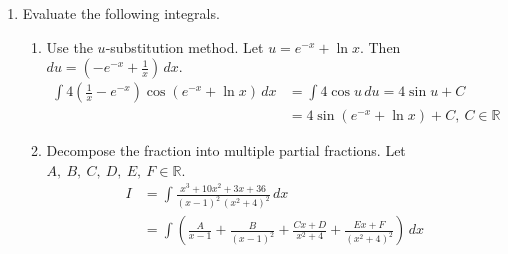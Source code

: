 \documentclass[a4paper, 12pt]{article}
\begin{document}
\begin{enumerate}[leftmargin=*,label=\textbf{\arabic*.}]
Let $V$ be the volume of the solid.
\begin{align*}
V&=\int_D2\pi\cdot h(y)\cdot r(y)\,dy=2\pi\int_{-5}^2(y+8)\cdot\left[(6-3y)-(y^2-4)\right]\,dy\\[1em]&=2\pi\int_{-5}^2(y+8)(-y^2-3y+10)\,dy\\[1em]&=2\pi\int_{-5}^2\left(-y^3-3y^2+10y-8y^2-24y+80\right)\,dy\\[1em]&=2\pi\int_{-5}^2\left(-y^3-11y^2-14y+80\right)\,dy=2\pi\left[-\frac{y^4}4-\frac{11y^3}3-7y^2+80y\right]_{-5}^2\\[1em]&=2\pi\left[\left(-4-\frac{88}3-28+160\right)-\left(\frac{625}4+\frac{1375}3-175-400\right)\right]=\boxed{\frac{4459\pi}6}
\end{align*}

\item Evaluate the following integrals.
\begin{enumerate}[leftmargin=*,label=\textbf{\alph*.}]
\item Use the $u$-substitution method. Let $u= e^{-x}+\ln x$. Then $du=\left(- e^{-x}+\frac1x\right)\,dx$.
\begin{align*}\int4\left(\frac1x- e^{-x}\right)\cos\left( e^{-x}+\ln x\right)\,dx&=\int4\cos u\,du=4\sin u+C\\[1em]&=\boxed{4\sin\left( e^{-x}+\ln x\right)+C,\:C\in\mathbb{R}}\end{align*}

\item Decompose the fraction into multiple partial fractions. Let $A,\:B,\:C,\:D,\:E,\:F\in\mathbb{R}$.
\begin{align*}I&=\int\frac{x^3+10x^2+3x+36}{(x-1)^2\,\left(x^2+4\right)^2}\,dx\\[1em]&=\int\left(\frac{A}{x-1}+\frac{B}{(x-1)^2}+\frac{Cx+D}{x^2+4}+\frac{Ex+F}{(x^2+4)^2}\right)\,dx\end{align*}


\end{enumerate}
\end{enumerate}
\end{document}

